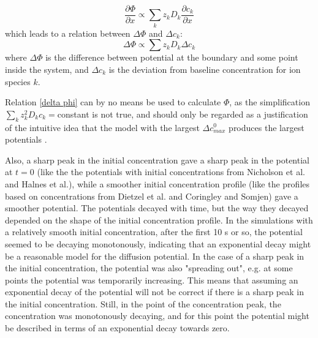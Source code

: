 \documentclass{article}
\begin{document}
\begin{equation}
 \frac{\partial \Phi}{\partial x}  \propto { \sum_k z_k D_k \frac{\partial c_k}{\partial x} }
\end{equation}
which leads to a relation between $\Delta \Phi$ and $\Delta c_k$:
\begin{equation}\label{delta phi}
 \Delta \Phi \propto \sum z_k D_k \Delta c_k
\end{equation}
where $\Delta \Phi $ is the difference between potential at the boundary and some point inside the system, and $\Delta c_k $ is the deviation from baseline concentration for ion species $k$.



Relation \ref{delta phi} can by no means be used to calculate $\Phi$, as the simplification $\sum_k z_k^2 D_k c_k =$constant is not true, and should only be regarded as a justification of the intuitive idea that the model with the largest $\Delta c_{max}^0$ produces the largest potentials . 



Also, a sharp peak in the initial concentration gave a sharp peak in the potential at $t=0$ (like the the potentials with initial concentrations from Nicholson et al. and Halnes et al.), while a smoother initial concentration profile (like the profiles based on concentrations from Dietzel et al. and Coringley and Somjen) gave a smoother potential. The potentials decayed with time, but the way they decayed depended on the shape of the initial concentration profile. In the simulations with a relatively smooth initial concentration, after the first 10 s or so, the potential seemed to be decaying monotonously, indicating that an exponential decay might be a reasonable model for the diffusion potential. In the case of a sharp peak in the initial concentration, the potential was also "spreading out", e.g. at some points the potential was temporarily increasing. This means that assuming an exponential decay of the potential will not be correct if there is a sharp peak in the initial concentration. Still, in the point of the concentration peak, the concentration was monotonously decaying, and for this point the potential might be described in terms of an exponential decay towards zero. 
\end{document}
